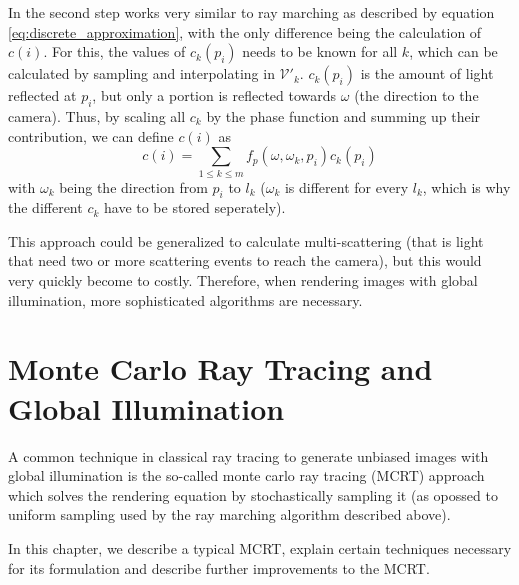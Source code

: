 In the second step works very similar to ray marching as described by equation \ref{eq:discrete_approximation}, with the only difference being the calculation of $c(i)$. For this, the values of $c_k(p_i)$ needs to be known for all $k$, which can be calculated by sampling and interpolating in $\mathcal{V'}_k$.
$c_k(p_i)$ is the amount of light reflected at $p_i$, but only a portion is reflected towards $\omega$ (the direction to the camera). Thus, by scaling all $c_k$ by the phase function and summing up their contribution, we can define $c(i)$ as
\begin{equation}
c(i) = \sum_{1 \le k \le m} f_p(\omega, \omega_k, p_i)c_k(p_i)
\end{equation}
with $\omega_k$ being the direction from $p_i$ to $l_k$ ($\omega_k$ is different for every $l_k$, which is why the different $c_k$ have to be stored seperately).

This approach could be generalized to calculate multi-scattering (that is light that need two or more scattering events to reach the camera), but this would very quickly become to costly. Therefore, when rendering images with global illumination, more sophisticated algorithms are necessary.
\section{Monte Carlo Ray Tracing and Global Illumination}
A common technique in classical ray tracing to generate unbiased images with global illumination is the so-called monte carlo ray tracing (MCRT) approach which solves the rendering equation by stochastically sampling it (as opossed to uniform sampling used by the ray marching algorithm described above).

In this chapter, we describe a typical MCRT, explain certain techniques necessary for its formulation and describe further improvements to the MCRT. 

